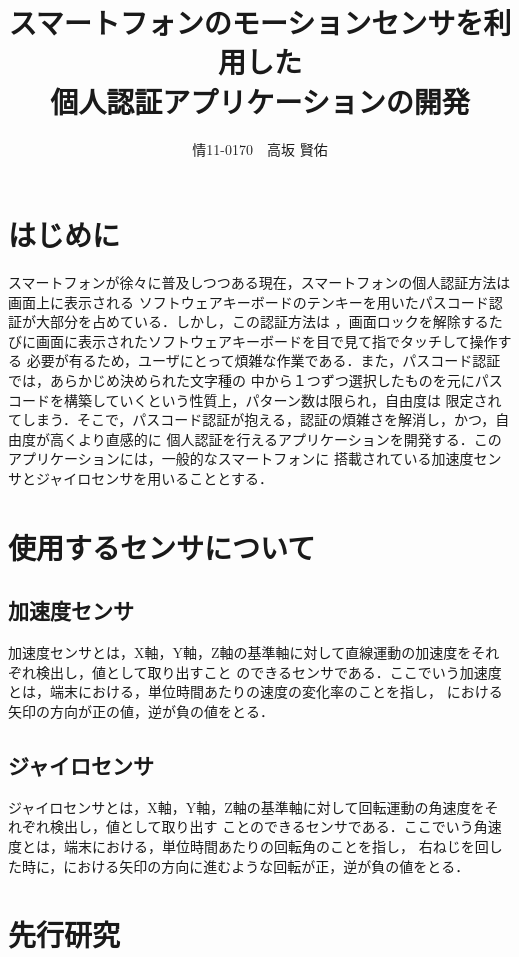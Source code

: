 \documentclass[11pt]{jreport}
\title{\bfseries スマートフォンのモーションセンサを利用した\\個人認証アプリケーションの開発}
\author{情11-0170　高坂 賢佑}
\date{}
\begin{document}
\maketitle

\tableofcontents
\listoffigures

\chapter*{はじめに}
スマートフォンが徐々に普及しつつある現在，スマートフォンの個人認証方法は画面上に表示される
ソフトウェアキーボードのテンキーを用いたパスコード認証が大部分を占めている．しかし，この認証方法は
，画面ロックを解除するたびに画面に表示されたソフトウェアキーボードを目で見て指でタッチして操作する
必要が有るため，ユーザにとって煩雑な作業である．また，パスコード認証では，あらかじめ決められた文字種の
中から１つずつ選択したものを元にパスコードを構築していくという性質上，パターン数は限られ，自由度は
限定されてしまう．そこで，パスコード認証が抱える，認証の煩雑さを解消し，かつ，自由度が高くより直感的に
個人認証を行えるアプリケーションを開発する．このアプリケーションには，一般的なスマートフォンに
搭載されている加速度センサとジャイロセンサを用いることとする．

\chapter{使用するセンサについて}
	\section{加速度センサ}
	加速度センサとは，X軸，Y軸，Z軸の基準軸に対して直線運動の加速度をそれぞれ検出し，値として取り出すこと
	のできるセンサである．ここでいう加速度とは，端末における，単位時間あたりの速度の変化率のことを指し，
	における矢印の方向が正の値，逆が負の値をとる．
	
	\section{ジャイロセンサ}
	ジャイロセンサとは，X軸，Y軸，Z軸の基準軸に対して回転運動の角速度をそれぞれ検出し，値として取り出す
	ことのできるセンサである．ここでいう角速度とは，端末における，単位時間あたりの回転角のことを指し，
	右ねじを回した時に，における矢印の方向に進むような回転が正，逆が負の値をとる．

\chapter{先行研究}
\end{document}
